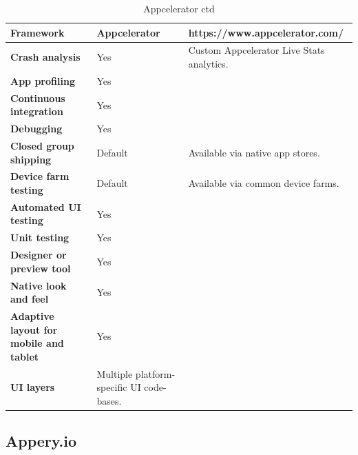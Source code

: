 \documentclass[english,master,public,dept460,male,cpdeclaration,oneside]{diploma}
\begin{document}
\begin{table}[!h]
\centering
\caption{Appcelerator ctd}
\begin{tabular}{p{} | p{} | p{}}
	\toprule		
	\textbf{Framework} & \textbf{Appcelerator} & https://www.appcelerator.com/ \\
	\midrule
	\textbf{Crash analysis} & Yes & Custom Appcelerator Live Stats analytics. \\			
	\midrule
	\textbf{App profiling} & Yes & \\			
	\midrule
	\textbf{Continuous integration} & Yes & \\			
	\midrule
	\textbf{Debugging} & Yes & \\			
	\midrule
	\textbf{Closed group shipping} & Default & Available via native app stores. \\			
	\midrule
	\textbf{Device farm testing} & Default & Available via common device farms. \\			
	\midrule
	\textbf{Automated UI testing} & Yes & \\			
	\midrule
	\textbf{Unit testing} & Yes & \\			
	\midrule
	\textbf{Designer or preview tool} & Yes & \\			
	\midrule
	\textbf{Native look and feel} & Yes & \\			
	\midrule
	\textbf{Adaptive layout for mobile and tablet} & Yes & \\			
	\midrule		
	\textbf{UI layers} & Multiple platform-specific UI code-bases. & \\			
	\midrule
\end{tabular}
\end{table}

\clearpage
\subsection{Appery.io}
\end{document}
